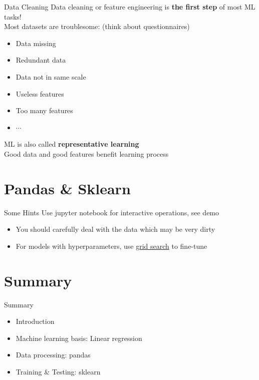 \documentclass{../TexTemplate/myslide}
\begin{document}
\begin{frame}{Data Cleaning}
Data cleaning or feature engineering is \textbf{the first step} of most ML tasks!\\
Most datasets are troublesome: (think about questionnaires)
\begin{itemize}
	\item Data missing
	\item Redundant data
	\item Data not in same scale
	\item Useless features
	\item Too many features
	\item $\cdots$
\end{itemize}
ML is also called \textbf{representative learning}\\
Good data and good features benefit learning process
\end{frame}

\section{Pandas \& Sklearn}
\begin{frame}
\sectionpage
\end{frame}

\begin{frame}{Some Hints}
Use jupyter notebook for interactive operations, see demo
\begin{itemize}
	\item You should carefully deal with the data which may be very dirty
	\item For models with hyperparameters, use \href{https://scikit-learn.org/stable/modules/grid_search.html}{grid search} to fine-tune
\end{itemize}
\end{frame}

\section{Summary}
\begin{frame}
\sectionpage
\end{frame}

\begin{frame}{Summary}
\begin{itemize}
	\item Introduction
	\item Machine learning basis: Linear regression
	\item Data processing: pandas
	\item Training \& Testing: sklearn
\end{itemize}
\end{frame}
\end{document}
